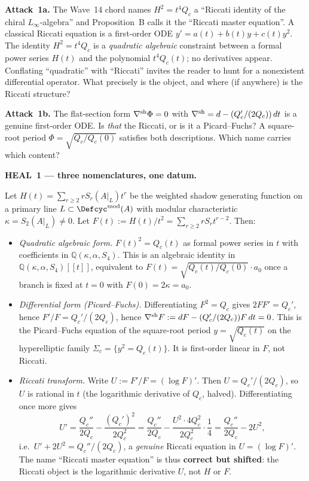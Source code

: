 \textbf{Attack~1a.} The Wave~14 chord names $H^2 = t^4 Q_c$ a ``Riccati
identity of the chiral $L_\infty$-algebra'' and Proposition~B calls it the
``Riccati master equation''. A classical Riccati equation is a first-order
ODE $y' = a(t) + b(t) y + c(t) y^2$. The identity $H^2 = t^4 Q_c$ is a
\emph{quadratic algebraic} constraint between a formal power series $H(t)$
and the polynomial $t^4 Q_c(t)$; no derivatives appear. Conflating
``quadratic'' with ``Riccati'' invites the reader to hunt for a nonexistent
differential operator. What precisely is the object, and where (if anywhere)
is the Riccati structure?

\textbf{Attack~1b.} The flat-section form $\nabla^{\rm sh}\Phi = 0$ with
$\nabla^{\rm sh} = d - (Q_c'/(2Q_c))\,dt$ is a genuine first-order ODE. Is
\emph{that} the Riccati, or is it a Picard--Fuchs? A square-root period
$\Phi = \sqrt{Q_c/Q_c(0)}$ satisfies both descriptions. Which name carries
which content?

\textbf{HEAL~1 --- three nomenclatures, one datum.}

Let $H(t) = \sum_{r \ge 2} r S_r(A|_L) t^r$ be the weighted shadow
generating function on a primary line $L \subset \Defcyc^{\mathrm{mod}}(A)$
with modular characteristic $\kappa = S_2(A|_L) \ne 0$. Let
$F(t) := H(t)/t^2 = \sum_{r\ge 2} r S_r t^{r-2}$. Then:

\begin{itemize}
\item \emph{Quadratic algebraic form.} $F(t)^2 = Q_c(t)$ as formal power
  series in $t$ with coefficients in $\mathbb Q(\kappa, \alpha, S_4)$. This
  is an algebraic identity in $\mathbb Q(\kappa,\alpha,S_4)[[t]]$, equivalent
  to $F(t) = \sqrt{Q_c(t)/Q_c(0)} \cdot a_0$ once a branch is fixed at $t=0$
  with $F(0) = 2\kappa = a_0$.
\item \emph{Differential form (Picard--Fuchs).} Differentiating $F^2 = Q_c$
  gives $2F F' = Q_c'$, hence $F'/F = Q_c'/(2Q_c)$, hence
  $\nabla^{\rm sh} F := dF - (Q_c'/(2Q_c)) F\,dt = 0$. This is the
  Picard--Fuchs equation of the square-root period $y = \sqrt{Q_c(t)}$
  on the hyperelliptic family $\Sigma_c = \{y^2 = Q_c(t)\}$. It is
  first-order linear in $F$, not Riccati.
\item \emph{Riccati transform.} Write $U := F'/F = (\log F)'$. Then
  $U = Q_c'/(2Q_c)$, so $U$ is rational in $t$ (the logarithmic derivative
  of $Q_c$, halved). Differentiating once more gives
  \[
    U' = \frac{Q_c''}{2Q_c} - \frac{(Q_c')^2}{2Q_c^2}
       = \frac{Q_c''}{2Q_c} - \frac{U^2 \cdot 4 Q_c^2}{2Q_c^2}
       \cdot \frac{1}{4}
       = \frac{Q_c''}{2Q_c} - 2U^2,
  \]
  i.e.\ $U' + 2U^2 = Q_c''/(2Q_c)$, a \emph{genuine} Riccati equation in
  $U = (\log F)'$. The name ``Riccati master equation'' is thus
  \textbf{correct but shifted}: the Riccati object is the logarithmic
  derivative $U$, not $H$ or $F$.
\end{itemize}

